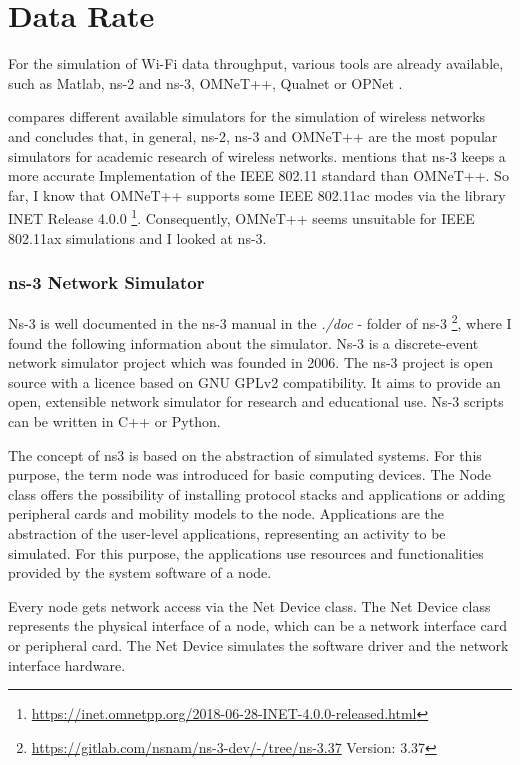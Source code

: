 \section{Data Rate}
\label{sec:DataRate}
For the simulation of Wi-Fi data throughput, various tools are already available, such as Matlab, ns-2 and ns-3, OMNeT++, Qualnet \cite{keller_simulation_2021} or OPNet \cite{kumar_simulators_2012}.

\textcite{kumar_simulators_2012} compares different available simulators for the simulation of wireless networks and concludes that, in general, ns-2, ns-3 and OMNeT++ are the most popular simulators for academic research of wireless networks.
\textcite{keller_simulation_2021} mentions that ns-3 keeps a more accurate Implementation of the IEEE 802.11 standard than OMNeT++.
So far, I know that OMNeT++ supports some IEEE 802.11ac modes via the library INET Release 4.0.0 \footnote{\url{https://inet.omnetpp.org/2018-06-28-INET-4.0.0-released.html}}.
Consequently, OMNeT++ seems unsuitable for IEEE 802.11ax simulations and I looked at ns-3.


\subsubsection*{ns-3 Network Simulator}
Ns-3 is well documented in the ns-3 manual in the \textit{./doc} - folder of ns-3 \footnote{\url{https://gitlab.com/nsnam/ns-3-dev/-/tree/ns-3.37} Version: 3.37}, where I found the following information about the simulator.
Ns-3 is a discrete-event network simulator project which was founded in 2006.
The ns-3 project is open source with a licence based on GNU GPLv2 compatibility.
It aims to provide an open, extensible network simulator for research and educational use.
Ns-3 scripts can be written in C++ or Python.

The concept of ns3 is based on the abstraction of simulated systems.
For this purpose, the term node was introduced for basic computing devices.
The Node class offers the possibility of installing protocol stacks and applications or adding peripheral cards and mobility models to the node.
Applications are the abstraction of the user-level applications, representing an activity to be simulated.
For this purpose, the applications use resources and functionalities provided by the system software of a node.

Every node gets network access via the Net Device class.
The Net Device class represents the physical interface of a node,
which can be a network interface card or peripheral card.
The Net Device simulates the software driver and the network interface hardware.

